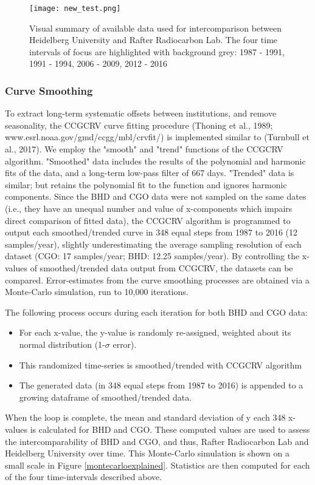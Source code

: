 \documentclass{BrJG_submit}
\begin{document}
\begin{figure}[h!]
  \texttt{[image: new\_test.png]}
  \caption{Visual summary of available data used for intercomparison between Heidelberg University and Rafter Radiocarbon Lab. The four time intervals of focus are highlighted with background grey: 1987 - 1991, 1991 - 1994, 2006 - 2009, 2012 - 2016 }
  \label{fig:results1}
\end{figure}



\subsubsection{Curve Smoothing}
To extract long-term systematic offsets between institutions, and remove seasonality, the CCGCRV curve fitting procedure (Thoning et al., 1989; www.esrl.noaa.gov/gmd/ccgg/mbl/crvfit/) is implemented similar to (Turnbull et al., 2017). We employ the "smooth" and "trend" functions of the CCGCRV algorithm. "Smoothed" data includes the results of the polynomial and harmonic fits of the data, and a long-term low-pass filter of 667 days. "Trended" data is similar; but retains the polynomial fit to the function and ignores harmonic components. 
Since the BHD and CGO data were not sampled on the same dates (i.e., they have an unequal number and value of x-components which impairs direct comparison of fitted data), the CCGCRV algorithm is programmed to output each smoothed/trended curve in 348 equal steps from 1987 to 2016 (12 samples/year), slightly underestimating the average sampling resolution of each dataset (CGO: 17 samples/year; BHD: 12.25 samples/year). By controlling the x-values of smoothed/trended data output from CCGCRV, the datasets can be compared. 
Error-estimates from the curve smoothing processes are obtained via a Monte-Carlo simulation, run to 10,000 iterations. 

The following process occurs during each iteration for both BHD and CGO data: 
\begin{itemize}
	\item For each x-value, the y-value is  randomly re-assigned, weighted about its normal distribution (1-${\sigma}$ error). 
	\item This randomized time-series is smoothed/trended with CCGCRV algorithm 
	\item The generated data (in 348 equal steps from 1987 to 2016) is appended to a growing dataframe of smoothed/trended data.
\end{itemize}
When the loop is complete, the mean and standard deviation of y each 348 x-values is calculated for BHD and CGO. These computed values are used to assess the intercomparability of BHD and CGO, and thus, Rafter Radiocarbon Lab and Heidelberg University over time. This Monte-Carlo simulation is shown on a small scale in Figure \ref{montecarloexplained}. Statistics are then computed for each of the four time-intervals described above. 
\end{document}
